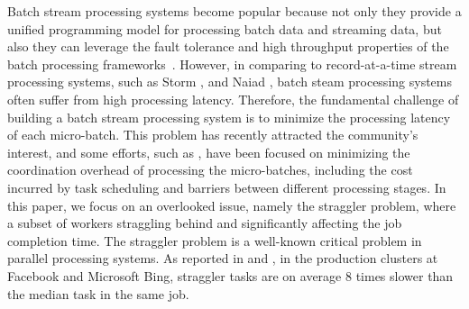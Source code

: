Batch stream processing systems become popular because not only they provide a
unified programming model for processing batch data and streaming data, but also
they can leverage the fault tolerance and high throughput properties of the
batch processing frameworks~\cite{spark-summit}. However, in comparing to
record-at-a-time stream processing systems, such as Storm \cite{storm-web}, and
Naiad \cite{Murray2013}, batch steam processing systems often suffer from high
processing latency. Therefore, the fundamental challenge of building a batch
stream processing system is to minimize the processing latency of each
micro-batch.
This problem has recently attracted the community's interest, and some efforts, such
as \cite{drizzle}, have been focused on minimizing the coordination overhead of
processing the micro-batches, including the cost incurred by task scheduling and
barriers between different processing stages. 
In this paper, we focus on an overlooked issue, namely the straggler problem,
where a subset of workers straggling behind and significantly affecting the job
completion time. The straggler problem is a well-known critical problem in
parallel processing systems. As reported in \cite{Ananthanarayanan2013} and
\cite{Yadwadkar2014}, in the production clusters at Facebook and Microsoft Bing,
straggler tasks are on average 8 times slower than the median task in the same
job. 

